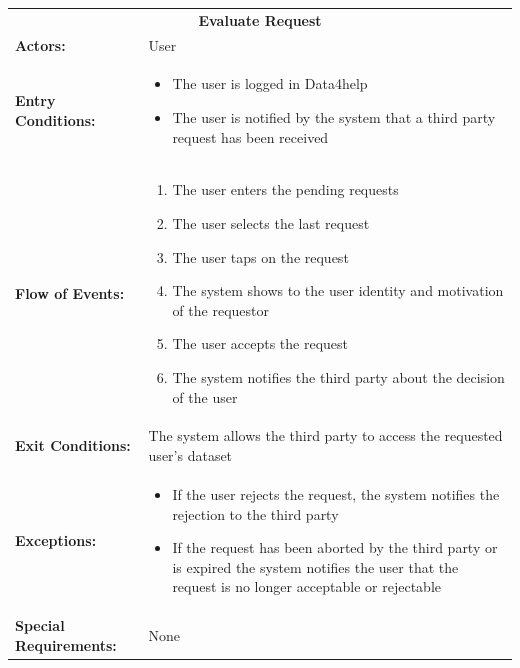 \begin{table}[H]
	\centering
	{\renewcommand{\arraystretch}{1.5}%
		\begin{tabular}{|@{\hspace{2em}} p{4cm} @{}| p{11cm} @{\qquad}|}
			\cline{1-2}
			\multicolumn{2}{|c|}{\textbf{Evaluate Request}} \\ \cline{1-2}
			\textbf{Actors:} & User \\ \cline{1-2}
			\textbf{Entry Conditions:} & \begin{itemize}[itemsep=-0.2em, topsep=0em]
				\item The user is logged in Data4help
				\item The user is notified by the system that a third party request has been received
			\end{itemize} \\ \cline{1-2}
			\textbf{Flow of Events:} & \begin{enumerate}[itemsep=-0.2em, topsep=0em]
				\item The user enters the pending requests
				\item The user selects the last request
				\item The user taps on the request 
				\item The system shows to the user identity and motivation of the requestor
				\item The user accepts the request
				\item The system notifies the third party about the decision of the user
			\end{enumerate} \\ \cline{1-2}
			\textbf{Exit Conditions:} & The system allows the third party to access the requested user's dataset\\ \cline{1-2}
			\textbf{Exceptions:} & 
			\begin{itemize}[itemsep=-0.2em, topsep=0em]
				\item If the user rejects the request, the system notifies the rejection to the third party
				\item If the request has been aborted by the third party or is expired  the system notifies the user that the request is no longer acceptable or rejectable
			\end{itemize} \\ \cline{1-2}
			\textbf{Special Requirements: } & None \\ \hline
	\end{tabular}} \quad
\end{table}

